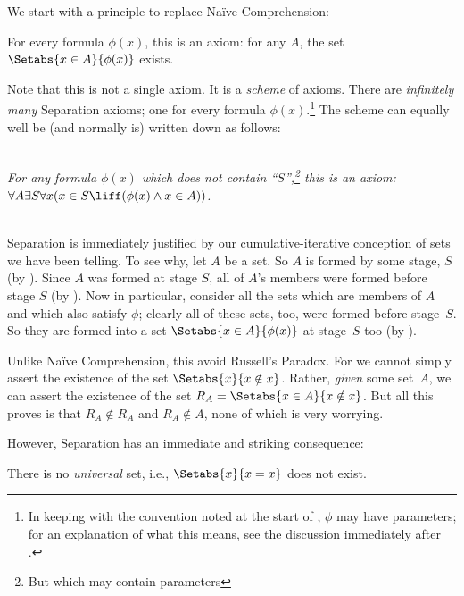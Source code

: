 \documentclass[../../../include/open-logic-section]{subfiles}
\begin{document}

We start with a principle to replace Na\"{i}ve Comprehension:

\begin{axiom} For every formula $\phi(x)$, this is an
axiom: for any $A$, the set $\Setabs{x \in A}{\phi(x)}$ exists.
\end{axiom}

Note that this is not a single axiom. It is a \emph{scheme} of axioms.
There are \emph{infinitely many} Separation axioms; one for every
formula $\phi(x)$.\footnote{In keeping with the convention noted at the start of , $\phi$ may have parameters; for an explanation of
	what this means, see the discussion immediately after
	.} The scheme can equally well be (and normally is) written down
as follows:

\ \\\emph{For any formula $\phi(x)$ which does not contain
``$S$'',\footnote{But which may contain parameters} this is an axiom:
\\$\forall A \exists S \forall x(x \in S \liff (\phi(x) \land x \in
A))$.}

\ \\Separation is immediately justified by our cumulative-iterative
conception of sets we have been telling. To see why, let $A$ be a set.
So $A$ is formed by some stage, $S$ (by \stageshier). Since $A$ was
formed at stage $S$, all of $A$'s members were formed before stage $S$
(by \stagesacc). Now in particular, consider all the sets which are
members of $A$ and which also satisfy $\phi$; clearly all of these
sets, too, were formed before stage~$S$. So they are formed into a set
$\Setabs{x \in A}{\phi(x)}$ at stage~$S$ too (by \stagesacc). 

Unlike Na\"ive Comprehension, this avoid Russell's Paradox. For we
cannot simply assert the existence of the set $\Setabs{x}{x \notin
x}$. Rather, \emph{given} some set~$A$, we can assert the existence of
the set $R_A = \Setabs{x \in A}{x \notin x}$. But all this proves is
that $R_A \notin R_A$ and $R_A \notin A$, none of which is very
worrying. 

However, Separation has an immediate and striking consequence:

\begin{thm}
There is no \emph{universal} set, i.e., $\Setabs{x}{x = x}$ does not exist.
\end{thm}
\end{document}
